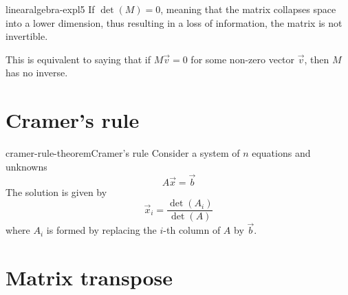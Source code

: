 \documentclass[preview]{standalone}
\begin{document}

\begin{snippet}{linearalgebra-expl5}
If \(\det(M) = 0\), meaning that the matrix collapses space into a lower dimension,
thus resulting in a loss of information, the matrix is not invertible.

This is equivalent to saying that if \(M\vec{v}=0\) for some non-zero vector \(\vec{v}\),
then \(M\) has no inverse.
\end{snippet}


\section{Cramer's rule}

\begin{snippettheorem}{cramer-rule-theorem}{Cramer's rule}
    Consider a system of \(n\) equations and unknowns
    \[
        A\vec{x}=\vec{b}
    \]
    The solution is given by
    \[
        \vec{x}_i = \frac{\det(A_i)}{\det(A)}
    \]
    where \(A_i\) is formed by replacing the \(i\)-th column
    of \(A\) by \(\vec{b}\).
\end{snippettheorem}

\section{Matrix transpose}
\end{document}
